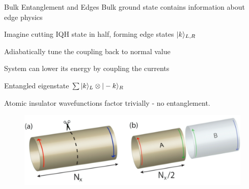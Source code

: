 \begin{frame}{Bulk Entanglement and Edges}
\vskip-1.5cm
Bulk ground state contains information about edge physics
\bi
\item  Imagine cutting IQH state in half, forming edge states $\vert k \rangle_{L, R}$
\item Adiabatically tune the coupling back to normal value 
\item System can lower its energy by coupling the currents
\item Entangled eigenstate $\sum \vert k \rangle_L \otimes\vert -k \rangle_R$ 
\item Atomic insulator wavefunctions factor trivially - no entanglement.
\ei 
\vskip-0.2cm
\begin{figure}
\includegraphics[width=\linewidth]{diagrams/entanglement_cut.png}
\end{figure}
\end{frame}

